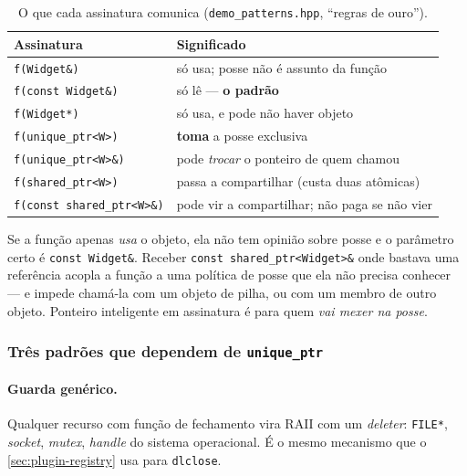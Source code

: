 \begin{table}[htbp]
\centering
\caption{O que cada assinatura comunica (\texttt{demo\_patterns.hpp},
         ``regras de ouro'').}
\label{tab:sp-passagem}
\footnotesize
\begin{tabular}{@{}ll@{}}
\toprule
\textbf{Assinatura} & \textbf{Significado} \\
\midrule
\texttt{f(Widget\&)}                 & só usa; posse não é assunto da função \\
\texttt{f(const Widget\&)}           & só lê --- \textbf{o padrão} \\
\texttt{f(Widget*)}                  & só usa, e pode não haver objeto \\
\texttt{f(unique\_ptr<W>)}           & \textbf{toma} a posse exclusiva \\
\texttt{f(unique\_ptr<W>\&)}         & pode \emph{trocar} o ponteiro de quem chamou \\
\texttt{f(shared\_ptr<W>)}           & passa a compartilhar (custa duas atômicas) \\
\texttt{f(const shared\_ptr<W>\&)}   & pode vir a compartilhar; não paga se não vier \\
\bottomrule
\end{tabular}
\end{table}

\begin{regra}
Se a função apenas \emph{usa} o objeto, ela não tem opinião sobre posse e o
parâmetro certo é \texttt{const Widget\&}. Receber \texttt{const
shared\_ptr<Widget>\&} onde bastava uma referência acopla a função a uma
política de posse que ela não precisa conhecer --- e impede chamá-la com um
objeto de pilha, ou com um membro de outro objeto. Ponteiro inteligente em
assinatura é para quem \emph{vai mexer na posse}.
\end{regra}

\subsubsection{Três padrões que dependem de \texttt{unique\_ptr}}

\paragraph{Guarda genérico.} Qualquer recurso com função de fechamento vira
RAII com um \emph{deleter}: \texttt{FILE*}, \emph{socket}, \emph{mutex},
\emph{handle} do sistema operacional. É o mesmo mecanismo que o
\cref{sec:plugin-registry} usa para \texttt{dlclose}.

